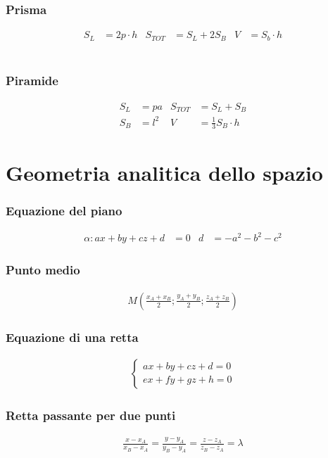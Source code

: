 \documentclass[a4paper]{article}
\begin{document}
	\subsubsection{Prisma}
	\begin{align*}
		S_L &= 2p \cdot h	&	S_{TOT} &= S_L +2S_B
		&			V &= S_b \cdot h
	\end{align*}
	\\
	\subsubsection{Piramide}
	\begin{align*}
		S_L &= pa	&	S_{TOT} &= S_L + S_B\\
		S_B &= l^2	&	V &= \frac{1}{3} S_B \cdot h
	\end{align*}
	
	\newpage
	\section{Geometria analitica dello spazio}

	\subsubsection{Equazione del piano}
	\begin{align*}
		\alpha : ax +by +cz+ d &= 0			&			d &= -a^2-b^2-c^2
	\end{align*}

	\subsubsection{Punto medio}
	\begin{align*}
		M \left( \frac{x_A + x_B}{2} ; \frac{y_A + y_B}{2} ; \frac{z_A + z_B}{2} \right)
	\end{align*}

	\subsubsection{Equazione di una retta}
	\begin{align*}
		\begin{cases}
		ax+by+cz+d=0\\
		ex+fy+gz+h=0
		\end{cases}
	\end{align*}

	\subsubsection{Retta passante per due punti}
	\begin{align*}
		\frac{x - x_A}{x_B - x_A} = \frac{y - y_A}{y_B - y_A} = \frac{z - z_A}{z_B - z_A} = \lambda
	\end{align*}
\end{document}
